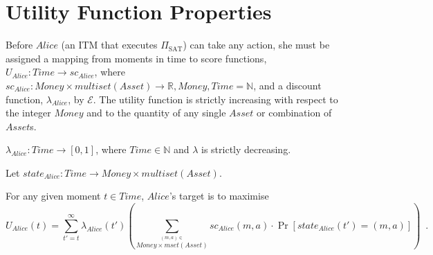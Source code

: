 \section{Utility Function Properties}
  Before $Alice$ (an ITM that executes $\Pi_{\mathrm{SAT}}$) can take any action, she must
  be assigned a mapping from moments in time to score functions, $U_{Alice} : Time
  \rightarrow sc_{Alice}$, where $sc_{Alice} : Money \times multiset\left(Asset\right)
  \rightarrow \mathbb{R}, Money, Time = \mathbb{N}$, and a discount function,
  $\lambda_{Alice}$, by $\mathcal{E}$.
  The utility function is strictly increasing with respect to the integer $Money$ and to
  the quantity of any single $Asset$ or combination of $Asset$s.

  \begin{definition}
    $\lambda_{Alice} : Time \rightarrow \left[0, 1\right]$, where $Time \in \mathbb{N}$
    and $\lambda$ is strictly decreasing.
  \end{definition}
  \begin{definition}[State]
  Let $state_{Alice} : Time \rightarrow Money \times multiset\left(Asset\right)$.
  \end{definition}
  For any given moment $t \in Time$, $Alice$'s target is to maximise
  \begin{equation*}
    U_{Alice}\left(t\right) = \sum\limits_{t' = t}^{\infty}
    \lambda_{Alice}\left(t'\right)\left(\sum\limits_{\overset{\left(m, a\right) \in}{Money
    \times mset\left(Asset\right)}} sc_{Alice}\left(m, a\right) \cdot
    \Pr\left[state_{Alice}\left(t'\right) = \left(m, a\right)\right]\right) \enspace.
  \end{equation*}
